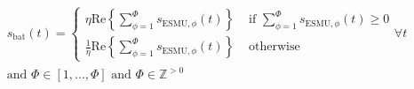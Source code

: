 \begin{equation}
\begin{split}
	s_\text{bat}(t) = 
	\begin{cases}
		\eta\text{Re}\left\{\sum_{\phi=1}^{\Phi}s_{\text{ESMU},\phi}(t)\right\} &\text{ if } \sum_{\phi=1}^{\Phi}s_{\text{ESMU},\phi}(t) \geq 0\\
		\frac{1}{\eta}\text{Re}\left\{\sum_{\phi=1}^{\Phi}s_{\text{ESMU},\phi}(t)\right\} &\text{ otherwise}
	\end{cases} \forall t \\
	\text{and } \Phi \in [1, \dots, \Phi] \text{ and } \Phi \in \mathbb{Z}^{>0}
\end{split}
\label{ch1:equ:battery-power-definition}
\end{equation}